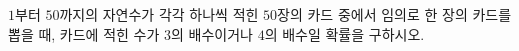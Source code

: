 $1$부터 $50$까지의 자연수가 각각 하나씩 적힌 $50$장의 카드 중에서 임의로 한 장의 카드를 뽑을 때, 카드에 적힌 수가 $3$의 배수이거나 $4$의 배수일 확률을 구하시오.

